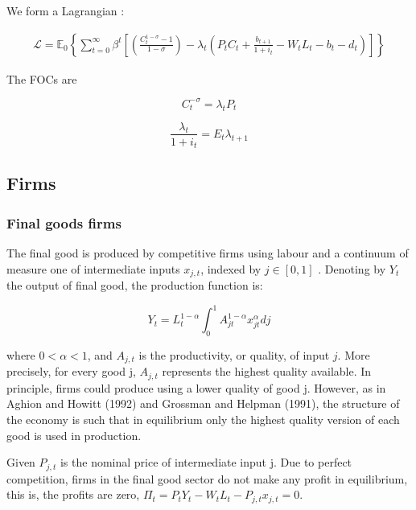 \documentclass[cn,10pt,math=newtx,citestyle=gb7714-2015,bibstyle=gb7714-2015]{elegantbook}
\begin{document}
{{	We form a Lagrangian :
	
	$$\begin{aligned}\mathcal{L}= \mathbb{E}_{0}\left\{\sum _ { t = 0 } ^ { \infty } \beta ^ { t } \left[\left(\frac{C_{t}^{1-\sigma}-1}{1-\sigma}\right)-\lambda_{t}\left(P_tC_{t}+\frac{b_{t+1}}{1+i_t}-W_{t} L_{t}-b_t-d_{t}\right)\right]\right\}\end{aligned}$$
	
	The FOCs are 
	
	\begin{equation}
		C_t^{-\sigma} = \lambda_t P_t
	\end{equation}
	
	\begin{equation}
		\frac{\lambda_t}{1+i_t} = E_t \lambda_{t+1}
	\end{equation}
	
	\subsection{Firms}
	
	\subsubsection{Final goods firms}
	
	The final good is produced by competitive firms using labour and a continuum of measure one of intermediate inputs $x_{j,t}$, indexed by $j \in [0,1]$ . Denoting by $Y_t$ the output of final good, the production function is:
	
	\begin{equation}
		Y_{t}=L_{t}^{1-\alpha} \int_{0}^{1} A_{j t}^{1-\alpha} x_{j t}^{\alpha} d j
	\end{equation}
	
	where $0<\alpha<1$, and $A_{j,t}$ is the productivity, or quality, of input $j$. More precisely, for every good j, $A_{j,t}$ represents the highest quality available. In principle, firms could produce using a lower quality of good j. However, as in Aghion and Howitt (1992) and Grossman and Helpman (1991), the structure of the economy is such that in equilibrium only the highest quality version of each good is used in production.
	
	Given $P_{j,t}$ is the nominal price of intermediate input j. Due to perfect competition, firms in the final good sector do not make any profit in equilibrium, this is, the profits are zero, $\Pi_t = P_t Y_t - W_t L_t - P_{j,t} x_{j,t}=0$.
	
}}
\end{document}
